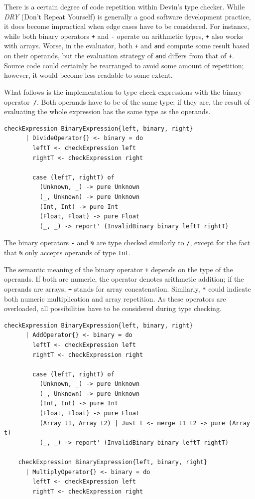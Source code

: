 \documentclass[UdineBachThesis,american,11pt]{PhdThesis}
\begin{document}
  There is a certain degree of code repetition within Devin's type checker.
  While \emph{DRY} (Don't Repeat Yourself) is generally a good software
  development practice, it does become impractical when edge cases have to be
  considered. For instance, while both binary operators \texttt{+} and
  \texttt{-} operate on arithmetic types, \texttt{+} also works with arrays.
  Worse, in the evaluator, both \texttt{+} and \mbox{\texttt{and}} compute some
  result based on their operands, but the evaluation strategy of
  \mbox{\texttt{and}} differs from that of \texttt{+}. Source code could
  certainly be rearranged to avoid some amount of repetition; however, it would
  become less readable to some extent.

  What follows is the implementation to type check expressions with the binary
  operator~\texttt{/}. Both operands have to be of the same type; if they are,
  the result of evaluating the whole expression has the same type as the
  operands.

  \begin{Verbatim}[gobble=4,fontsize=\small]
    checkExpression BinaryExpression{left, binary, right}
      | DivideOperator{} <- binary = do
        leftT <- checkExpression left
        rightT <- checkExpression right

        case (leftT, rightT) of
          (Unknown, _) -> pure Unknown
          (_, Unknown) -> pure Unknown
          (Int, Int) -> pure Int
          (Float, Float) -> pure Float
          (_, _) -> report' (InvalidBinary binary leftT rightT)
  \end{Verbatim}

  The binary operators \texttt{-} and \texttt{\%} are type checked similarly to
  \texttt{/}, except for the fact that \texttt{\%} only accepts operands of type
  \mbox{\texttt{Int}}.

  The semantic meaning of the binary operator \texttt{+} depends on the type of
  the operands. If both are numeric, the operator denotes arithmetic addition;
  if the operands are arrays, \texttt{+} stands for array concatenation.
  Similarly, \texttt{*} could indicate both numeric multiplication and array
  repetition. As these operators are overloaded, all possibilities have to be
  considered during type checking.

  \begin{Verbatim}[gobble=4,fontsize=\small]
    checkExpression BinaryExpression{left, binary, right}
      | AddOperator{} <- binary = do
        leftT <- checkExpression left
        rightT <- checkExpression right

        case (leftT, rightT) of
          (Unknown, _) -> pure Unknown
          (_, Unknown) -> pure Unknown
          (Int, Int) -> pure Int
          (Float, Float) -> pure Float
          (Array t1, Array t2) | Just t <- merge t1 t2 -> pure (Array t)
          (_, _) -> report' (InvalidBinary binary leftT rightT)

    checkExpression BinaryExpression{left, binary, right}
      | MultiplyOperator{} <- binary = do
        leftT <- checkExpression left
        rightT <- checkExpression right
  \end{Verbatim}
\end{document}
